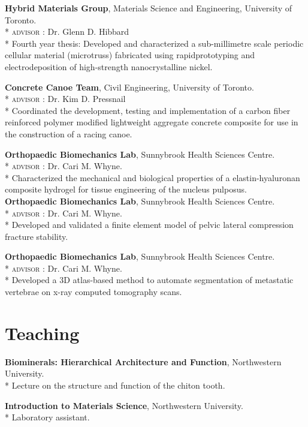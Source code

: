 \textbf{Hybrid Materials Group}, Materials Science and Engineering, University of Toronto.\\*
\textsc{advisor} : Dr. Glenn D. Hibbard\\*
Fourth year thesis: Developed and characterized a sub-millimetre scale periodic cellular material (microtruss) fabricated using rapidprototyping and electrodeposition of high-strength nanocrystalline nickel.

\textbf{Concrete Canoe Team}, Civil Engineering, University of Toronto.\\*
\textsc{advisor} : Dr. Kim D. Pressnail\\*
Coordinated the development, testing and implementation of a carbon fiber reinforced polymer modified lightweight aggregate concrete composite for use in the construction of a racing canoe.

\textbf{Orthopaedic Biomechanics Lab}, Sunnybrook Health Sciences Centre.\\*
\textsc{advisor} : Dr. Cari M. Whyne.\\*
Characterized the mechanical and biological properties of a elastin-hyaluronan composite hydrogel for tissue engineering of the nucleus pulposus.\\[0.3cm]
\textbf{Orthopaedic Biomechanics Lab}, Sunnybrook Health Sciences Centre.\\*
\textsc{advisor} : Dr. Cari M. Whyne.\\*
Developed and validated a finite element model of pelvic lateral compression fracture stability.

\textbf{Orthopaedic Biomechanics Lab}, Sunnybrook Health Sciences Centre.\\*
\textsc{advisor} : Dr. Cari M. Whyne.\\*
Developed a 3D atlas-based method to automate segmentation of metastatic vertebrae on x-ray computed tomography scans.
\endgroup

\section*{Teaching}
\textbf{Biominerals: Hierarchical Architecture and Function}, Northwestern University.\\*
\begingroup\setlength{\parskip}{0.1cm}
Lecture on the structure and function of the chiton tooth.

\textbf{Introduction to Materials Science}, Northwestern University.\\*
Laboratory assistant.

